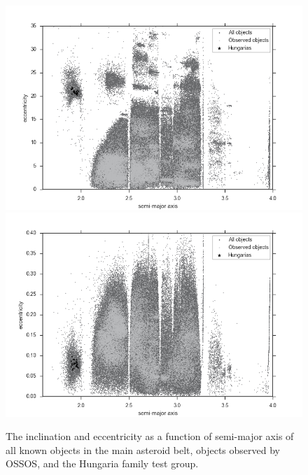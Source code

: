 \documentclass[iop,apj]{emulateapj}
\begin{document}
\begin{figure}[!htb]
    \centering
    \includegraphics[width=\linewidth]{graphs/obs_and_hungarias_i.png}
    \includegraphics[width=\linewidth]{graphs/obs_and_hungarias_e.png}
    \caption{The inclination and eccentricity as a function of semi-major axis of all known objects in the main asteroid belt, objects observed by OSSOS, and the Hungaria family test group. }\label{fig:2}
\end{figure}
\end{document}
